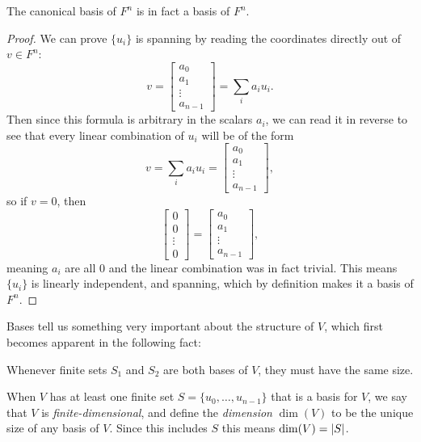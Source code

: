 \begin{prop}
	The canonical basis of $F^n$ is in fact a basis of $F^n$.
\end{prop}
\begin{proof}
	We can prove $\{u_i\}$ is spanning by reading the coordinates directly out of $v \in F^n$:
	\[v = \begin{bmatrix}
		a_0 \\ a_1 \\ \vdots \\ a_{n-1}
	\end{bmatrix} = \sum_i a_i u_i.\]
	Then since this formula is arbitrary in the scalars $a_i$, we can read it in reverse to see that every linear combination of $u_i$ will be of the form
	\[v = \sum_i a_i u_i = \begin{bmatrix}
		a_0 \\ a_1 \\ \vdots \\ a_{n-1}
	\end{bmatrix},\]
	so if $v = 0$, then
	\[\begin{bmatrix}
		0 \\ 0 \\ \vdots \\ 0
	\end{bmatrix} = \begin{bmatrix}
		a_0 \\ a_1 \\ \vdots \\ a_{n-1}
	\end{bmatrix},\]
	meaning $a_i$ are all 0 and the linear combination was in fact trivial. This means $\{u_i\}$ is linearly independent, and spanning, which by definition makes it a basis of $F^n$.
\end{proof}

Bases tell us something very important about the structure of $V$, which first becomes apparent in the following fact:
\begin{prop}
	Whenever finite sets $S_1$ and $S_2$ are both bases of $V$, they must have the same size.
\end{prop}

\begin{define}
	When $V$ has at least one finite set $S = \{u_0,\dots,u_{n-1}\}$ that is a basis for $V$, we say that $V$ is \emph{finite-dimensional}, and define the \emph{dimension} $\dim(V)$ to be the unique size of any basis of $V$. Since this includes $S$ this means $\dim(V) = \left| S \right|$.
\end{define}

